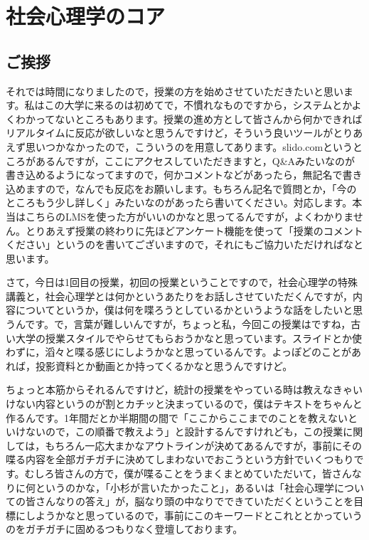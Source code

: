 \documentclass{ltjsbook}
\begin{document}
\chapter{社会心理学のコア}
\label{sp01_introduction}

\section{ご挨拶}

それでは時間になりましたので，授業の方を始めさせていただきたいと思います。私はこの大学に来るのは初めてで，不慣れなものですから，システムとかよくわかってないところもあります。授業の進め方として皆さんから何かできればリアルタイムに反応が欲しいなと思うんですけど，そういう良いツールがとりあえず思いつかなかったので，こういうのを用意してあります。slido.comというところがあるんですが，ここにアクセスしていただきますと，Q\&Aみたいなのが書き込めるようになってますので，何かコメントなどがあったら，無記名で書き込めますので，なんでも反応をお願いします。もちろん記名で質問とか，「今のところもう少し詳しく」みたいなのがあったら書いてください。対応します。本当はこちらのLMSを使った方がいいのかなと思ってるんですが，よくわかりません。とりあえず授業の終わりに先ほどアンケート機能を使って「授業のコメントください」というのを書いてございますので，それにもご協力いただければなと思います。

さて，今日は1回目の授業，初回の授業ということですので，社会心理学の特殊講義と，社会心理学とは何かというあたりをお話しさせていただくんですが，内容についてというか，僕は何を喋ろうとしているかというような話をしたいと思うんです。で，言葉が難しいんですが，ちょっと私，今回この授業はですね，古い大学の授業スタイルでやらせてもらおうかなと思っています。スライドとか使わずに，滔々と喋る感じにしようかなと思っているんです。よっぽどのことがあれば，投影資料とか動画とか持ってくるかなと思うんですけど。

ちょっと本筋からそれるんですけど，統計の授業をやっている時は教えなきゃいけない内容というのが割とカチッと決まっているので，僕はテキストをちゃんと作るんです。1年間だとか半期間の間で「ここからここまでのことを教えないといけないので，この順番で教えよう」と設計するんですけれども，この授業に関しては，もちろん一応大まかなアウトラインが決めてあるんですが，事前にその喋る内容を全部ガチガチに決めてしまわないでおこうという方針でいくつもりです。むしろ皆さんの方で，僕が喋ることをうまくまとめていただいて，皆さんなりに何というのかな，「小杉が言いたかったこと」，あるいは「社会心理学についての皆さんなりの答え」が，脳なり頭の中なりでできていただくということを目標にしようかなと思っているので，事前にこのキーワードとこれととかっていうのをガチガチに固めるつもりなく登壇しております。
\end{document}
